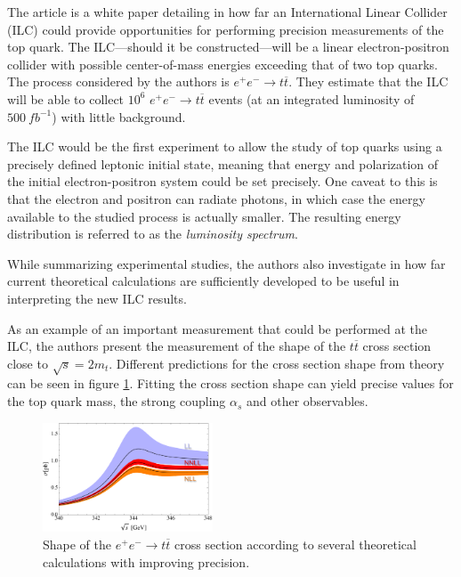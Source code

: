 

The article\cite{ilc} is a white paper detailing in how far an International Linear Collider (ILC) could provide opportunities for performing precision measurements of the top quark.
The ILC—should it be constructed—will be a linear electron-positron collider with possible center-of-mass energies exceeding that of two top quarks.
The process considered by the authors is $e^+e^-\to t\overline{t}$.
They estimate that the ILC will be able to collect $10^6$ $e^+e^-\to t\overline{t}$ events (at an integrated luminosity of $\SI{500}{fb}^{-1}$) with little background.

The ILC would be the first experiment to allow the study of top quarks using a precisely defined leptonic initial state, meaning that energy and polarization of the initial electron-positron system could be set precisely.
One caveat to this is that the electron and positron can radiate photons, in which case the energy available to the studied process is actually smaller.
The resulting energy distribution is referred to as the \emph{luminosity spectrum}.

While summarizing experimental studies, the authors also investigate in how far current theoretical calculations are sufficiently developed to be useful in interpreting the new ILC results.

As an example of an important measurement that could be performed at the ILC, the authors present the measurement of the shape of the $t\overline{t}$ cross section close to $\sqrt{s} = 2 m_t$.
Different predictions for the cross section shape from theory can be seen in figure \ref{crosssection}.
Fitting the cross section shape can yield precise values for the top quark mass, the strong coupling $\alpha_s$ and other observables.

\begin{figure}
  \includegraphics[width=0.45\textwidth]{./figures/TotCrossCombined.pdf}
  \caption{Shape of the $e^+e^-\to t\overline{t}$ cross section according to several theoretical calculations with improving precision.\cite{ilc}}
  \label{crosssection}
\end{figure}

